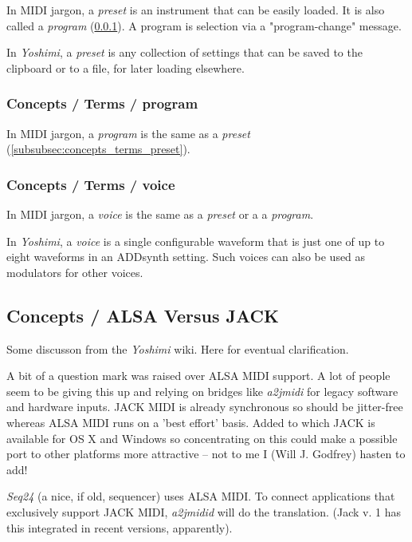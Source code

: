    In MIDI jargon, a \textsl{preset} is an instrument that can be easily
   loaded.
   It is also called a \textsl{program}
   (\ref{subsubsec:concepts_terms_program}).
   A program is selection via a "program-change" message.

   In \textsl{Yoshimi}, a \textsl{preset} is any collection of settings that
   can be saved to the clipboard or to a file, for later loading elsewhere.

\subsubsection{Concepts / Terms / program}
\label{subsubsec:concepts_terms_program}

   In MIDI jargon, a \textsl{program} is the same as a \textsl{preset}
   (\ref{subsubsec:concepts_terms_preset}).

\subsubsection{Concepts / Terms / voice}
\label{subsubsec:concepts_terms_voice}

   In MIDI jargon, a \textsl{voice} is the same as
   a \textsl{preset} or a a \textsl{program}.

   In \textsl{Yoshimi}, a \textsl{voice} is a single configurable waveform
   that is just one of up to eight waveforms in an ADDsynth setting.
   Such voices can also be used as modulators for other voices.

\subsection{Concepts / ALSA Versus JACK}
\label{subsec:concepts_alsa_versus_jack}

   Some discusson from the \textsl{Yoshimi} wiki.  Here for eventual
   clarification.

   A bit of a question mark was raised over ALSA MIDI support. A lot of
   people seem to be giving this up and relying on bridges like
   \textsl{a2jmidi} for legacy software and hardware inputs. JACK MIDI is
   already synchronous so should be jitter-free whereas ALSA MIDI runs on a
   'best effort' basis. Added to which JACK is available for OS X and
   Windows so concentrating on this could make a possible port to other
   platforms more attractive -- not to me I (Will J. Godfrey) hasten to add!

   \textsl{Seq24} (a nice, if old, sequencer) uses ALSA MIDI. To connect
   applications that exclusively support JACK MIDI, \textsl{a2jmidid} will
   do the translation.  (Jack v. 1 has this integrated in recent versions,
   apparently).


